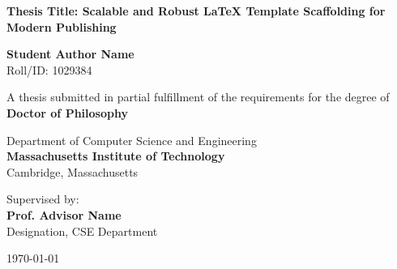 \begin{titlepage}
\begin{center}
    \vspace*{1cm}
    
    
    \vspace{1.5cm}
    
    {\huge \bfseries \color{primary} Thesis Title: Scalable and Robust LaTeX Template Scaffolding for Modern Publishing}
    
    \vspace{1.5cm}
    
    {\Large \bfseries Student Author Name} \\
    \vspace{0.2cm}
    {Roll/ID: 1029384}
    
    \vspace{1.5cm}
    
    {A thesis submitted in partial fulfillment of the requirements for the degree of} \\
    \vspace{0.3cm}
    {\large \bfseries \color{secondary} Doctor of Philosophy}
    
    \vspace{1.5cm}
    
    {\large Department of Computer Science and Engineering} \\
    \vspace{0.2cm}
    {\large \bfseries \color{primary} Massachusetts Institute of Technology} \\
    \vspace{0.1cm}
    {Cambridge, Massachusetts}
    
    \vfill
    
    {Supervised by:} \\
    {\large \bfseries Prof. Advisor Name} \\
    {Designation, CSE Department}
    
    \vspace{1cm}
    
    {\large \today}
    
\end{center}
\end{titlepage}
